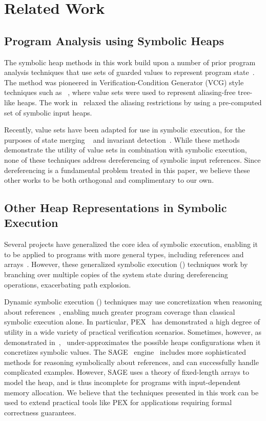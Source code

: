 \section{Related Work}
\label{sec:related}

\subsection{Program Analysis using Symbolic Heaps}
The symbolic heap methods in this work build upon a
number of prior program analysis techniques that use sets of guarded values to
represent program
state~\cite{Sen:2014,Torlak:2014,Yorsh:2008,Xie:2005,Dillig:2011,Elkarablieh:2009}. 
The method was pioneered in Verification-Condition Generator (VCG) style techniques such as ~\cite{Xie:2005,Yorsh:2008}, where value sets were used to 
represent aliasing-free tree-like heaps. The work in~\cite{Dillig:2011} relaxed the aliasing restrictions by using a pre-computed set of symbolic input heaps.

Recently, value sets have been adapted for use in symbolic execution, for the purposes of state merging ~\cite{Sen:2014,Torlak:2014} and invariant detection~\cite{Ferrara:2014}. While these methods demonstrate the utility of value sets in combination with symbolic execution, none of these techniques address dereferencing of symbolic input references. Since dereferencing is a fundamental problem treated in this paper, we believe these other works to be both orthogonal and complimentary to our own.

\subsection{Other Heap Representations in Symbolic Execution}
Several projects have generalized the core idea of symbolic execution,
enabling it to be applied to programs with more general types,
including references and
arrays~\cite{GSE03,KiasanKunit,Cadar:2008,Rosner:2015}. However, these
generalized symbolic execution (\gsetxt{}) techniques work by branching over
multiple copies of the system state during dereferencing operations,
exacerbating path explosion.

Dynamic symbolic execution (\dsetxt{}) techniques may use
concretization when reasoning about references~\cite{Godefroid:2005,Sen:2005,Godefroid:POPL07,Tillmann:2008}, enabling much greater program
coverage than classical symbolic execution alone. In particular, PEX~\cite{Tillmann:2008}
has demonstrated a high degree of utility in a wide variety of 
practical verification scenarios. Sometimes,
however, as demonstrated in~\cite{Elkarablieh:2009},~\dsetxt{}
under-approximates the possible heaps configurations when it
concretizes symbolic values. The SAGE~\dsetxt{}
engine~\cite{Elkarablieh:2009} includes more sophisticated methods for
reasoning symbolically about references, and can successfully handle
complicated examples. However, SAGE uses a
theory of fixed-length arrays to model the heap, and is thus incomplete
for programs with input-dependent memory allocation. We believe that the 
techniques presented in this work can be used to extend practical tools 
like PEX for applications requiring formal correctness guarantees.


